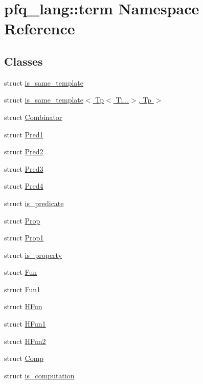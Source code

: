 \hypertarget{namespacepfq__lang_1_1term}{\section{pfq\-\_\-lang\-:\-:term Namespace Reference}
\label{namespacepfq__lang_1_1term}
}
\subsection*{Classes}
\begin{DoxyCompactItemize}
\item 
struct \hyperlink{structpfq__lang_1_1term_1_1is__same__template}{is\-\_\-same\-\_\-template}
\item 
struct \hyperlink{structpfq__lang_1_1term_1_1is__same__template_3_01Tp_3_01Ti_8_8_8_4_00_01Tp_01_4}{is\-\_\-same\-\_\-template$<$ Tp$<$ Ti...$>$, Tp $>$}
\item 
struct \hyperlink{structpfq__lang_1_1term_1_1Combinator}{Combinator}
\item 
struct \hyperlink{structpfq__lang_1_1term_1_1Pred1}{Pred1}
\item 
struct \hyperlink{structpfq__lang_1_1term_1_1Pred2}{Pred2}
\item 
struct \hyperlink{structpfq__lang_1_1term_1_1Pred3}{Pred3}
\item 
struct \hyperlink{structpfq__lang_1_1term_1_1Pred4}{Pred4}
\item 
struct \hyperlink{structpfq__lang_1_1term_1_1is__predicate}{is\-\_\-predicate}
\item 
struct \hyperlink{structpfq__lang_1_1term_1_1Prop}{Prop}
\item 
struct \hyperlink{structpfq__lang_1_1term_1_1Prop1}{Prop1}
\item 
struct \hyperlink{structpfq__lang_1_1term_1_1is__property}{is\-\_\-property}
\item 
struct \hyperlink{structpfq__lang_1_1term_1_1Fun}{Fun}
\item 
struct \hyperlink{structpfq__lang_1_1term_1_1Fun1}{Fun1}
\item 
struct \hyperlink{structpfq__lang_1_1term_1_1HFun}{H\-Fun}
\item 
struct \hyperlink{structpfq__lang_1_1term_1_1HFun1}{H\-Fun1}
\item 
struct \hyperlink{structpfq__lang_1_1term_1_1HFun2}{H\-Fun2}
\item 
struct \hyperlink{structpfq__lang_1_1term_1_1Comp}{Comp}
\item 
struct \hyperlink{structpfq__lang_1_1term_1_1is__computation}{is\-\_\-computation}
\end{DoxyCompactItemize}
